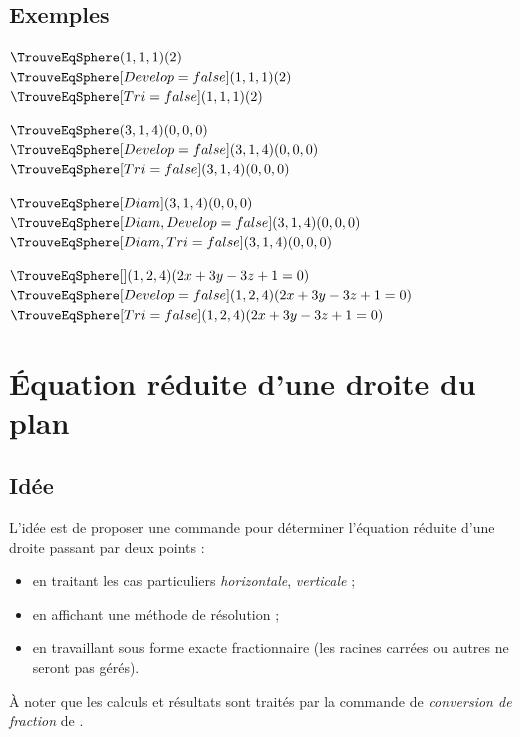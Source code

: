 \subsection{Exemples}

\begin{PresCodePL}{}
$\TrouveEqSphere(1,1,1)(2)$\\
$\TrouveEqSphere[Develop=false](1,1,1)(2)$\\
$\TrouveEqSphere[Tri=false](1,1,1)(2)$
\end{PresCodePL}

\begin{PresCodePL}{}
$\TrouveEqSphere(3,1,4)(0,0,0)$\\
$\TrouveEqSphere[Develop=false](3,1,4)(0,0,0)$\\
$\TrouveEqSphere[Tri=false](3,1,4)(0,0,0)$
\end{PresCodePL}

\begin{PresCodePL}{}
$\TrouveEqSphere[Diam](3,1,4)(0,0,0)$\\
$\TrouveEqSphere[Diam,Develop=false](3,1,4)(0,0,0)$\\
$\TrouveEqSphere[Diam,Tri=false](3,1,4)(0,0,0)$
\end{PresCodePL}

\begin{PresCodePL}{}
$\TrouveEqSphere[](1,2,4)(2x+3y-3z+1=0)$\\
$\TrouveEqSphere[Develop=false](1,2,4)(2x+3y-3z+1=0)$\\
$\TrouveEqSphere[Tri=false](1,2,4)(2x+3y-3z+1=0)$
\end{PresCodePL}

\newpage

\section{Équation réduite d'une droite du plan}\label{eqreduite}

\subsection{Idée}

\begin{tipblock}
 L'idée est de proposer une commande pour déterminer l'équation réduite d'une droite passant par deux points :
\begin{itemize}
	\item en traitant les cas particuliers \textit{horizontale}, \textit{verticale} ;
	\item en affichant une méthode de résolution ;
	\item en travaillant sous forme exacte fractionnaire (les racines carrées ou autres ne seront pas gérés).
\end{itemize}

À noter que les calculs et résultats sont traités par la commande de \textit{conversion de fraction} de .
\end{tipblock}

